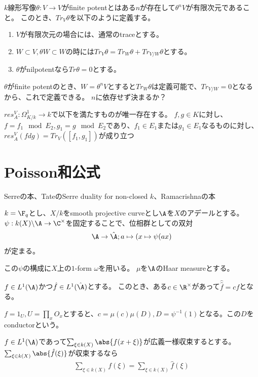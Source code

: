 \documentclass{jsarticle}
\begin{document}
\begin{dfn}[trace]
$k$線形写像$\theta:V \to V$がfinite potentとはある$n$が存在して$\theta^nV$が有限次元であること。
このとき、$Tr_V\theta$を以下のように定義する。
\begin{enumerate}
\item $V$が有限次元の場合には、通常のtraceとする。
\item $W\subset V, \theta W\subset W$の時には$Tr_V\theta=Tr_W\theta+Tr_{V/W}\theta$とする。
\item $\theta$がnilpotentなら$Tr\theta=0$とする。
\end{enumerate}
$\theta$がfinite potentのとき、$W=\theta^nV$とすると$Tr_W\theta$は定義可能で、$Tr_{V/W}=0$となるから、これで定義できる。
$n$に依存せず決まるか？
\end{dfn}

\begin{thm}
$res^V_A:\Omega^1_{K/k}\to k$で以下を満たすものが唯一存在する。
$f,g\in K$に対し、$f=f_1\mod E_2, g_1=g\mod E_2$であり、$f_1\in E_1$または$g_1\in E_1$なるものに対し、
$res^V_A(fdg)=Tr_V([f_1,g_1])$が成り立つ
\end{thm}

\section{Poisson和公式}
Serreの本、TateのSerre duality for non-closed $k$、Ramacrishnaの本

$k=\F_q$とし、$X/k$をsmooth projective curveとし$\A$を$X$のアデールとする。
$\psi:k(X)\backslash \A \to \C^\times$を固定することで、位相群としての双対
\begin{align*}
\A \to \hat{\A}; a\mapsto(x\mapsto\psi(ax)
\end{align*}
が定まる。

この$\psi$の構成に$X$上の$1$-form $\omega$を用いる。
$\mu$を$\A$のHaar measureとする。

\begin{prop}
$f\in L^1(\A)$かつ$\hat{f}\in L^1(\hat{\A})$とする。
このとき、ある$c\in\R^\times$があって$\hat{\hat{f}}=cf$となる。
\end{prop}
$f=1_U, U=\prod_xO_x$とすると、$c=\mu(c)\mu(D), D=\psi^{-1}(1)$となる。この$D$をconductorという。

\begin{thm}[Poisson和公式]
$f\in L^1(\A)$であって$\sum_{\xi\in k(X)}\abs{f(x+\xi)}$が広義一様収束するとする。
$\sum_{\xi\in k(X)}\abs{\hat{f}(\xi)}$が収束するなら
\begin{align*}
\sum_{\xi\in k(X)}f(\xi)=\sum_{\xi\in k(X)}\hat{f}(\xi)
\end{align*}
\end{thm}
\end{document}
